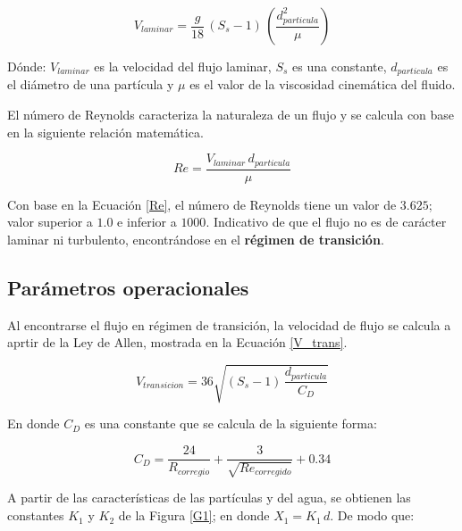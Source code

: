 \begin{equation}
	V_{laminar} = \frac{g}{18} \, (S_s - 1) \, \left(\frac{d_{particula}^2}{\mu} \right)
	\label{V_lam}
\end{equation}

\noindent
\justify

D\'onde: $V_{laminar}$ es la velocidad del flujo laminar, $S_s$ es una constante, $d_{particula}$ es el di\'ametro de una part\'icula y $\mu$ es el valor de la viscosidad cinem\'atica del fluido.

\noindent
\justify

El n\'umero de Reynolds caracteriza la naturaleza de un flujo y se calcula con base en la siguiente relaci\'on matem\'atica.

\begin{equation}
	Re = \frac{V_{laminar} \, d_{particula}}{\mu}
	\label{Re}
\end{equation}

\noindent
\justify

Con base en la Ecuaci\'on \ref{Re}, el n\'umero de Reynolds tiene un valor de $3.625$; valor superior a $1.0$ e inferior a $1000$. Indicativo de que el flujo no es de car\'acter laminar ni turbulento, encontr\'andose en el \textbf{r\'egimen de transici\'on}.

\subsection{Par\'ametros operacionales}

\noindent
\justify

Al encontrarse el flujo en r\'egimen de transici\'on, la velocidad de flujo se calcula a aprtir de la Ley de Allen, mostrada en la Ecuaci\'on \ref{V_trans}.

\begin{equation}
	V_{transicion} = 36 \sqrt{(S_s-1) \, \frac{d_{particula}}{C_D}}
	\label{V_trans}
\end{equation}


\noindent
\justify

En donde $C_D$ es una constante que se calcula de la siguiente forma:

\begin{equation}
	C_D = \frac{24}{R_{corregio}} + \frac{3}{\sqrt{Re_{corregido}}} + 0.34
	\label{C_D}
\end{equation}

\noindent
\justify

A partir de las caracter\'isticas de las part\'iculas y del agua, se obtienen las constantes $K_1$ y $K_2$ de la Figura \ref{G1}; en donde $X_1 = K_1  \, d$. De modo que:

